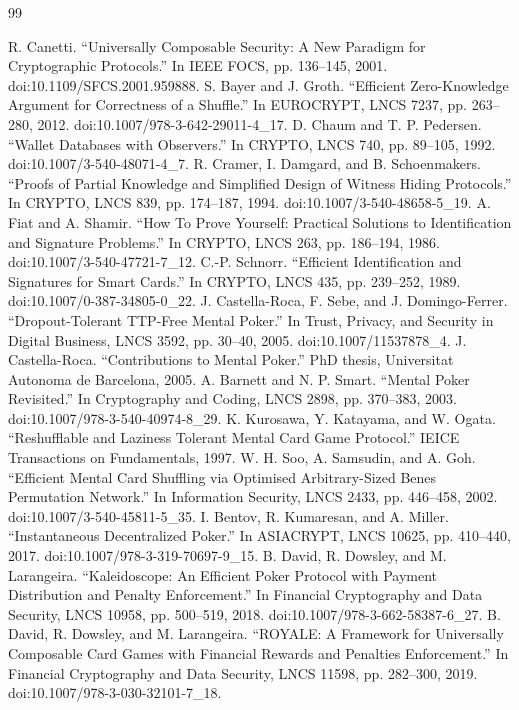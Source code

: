 \documentclass[11pt]{article}
\begin{document}
\begin{thebibliography}{99}

 R. Canetti. “Universally Composable Security: A New Paradigm for Cryptographic Protocols.” In IEEE FOCS, pp. 136–145, 2001. doi:10.1109/SFCS.2001.959888.
 S. Bayer and J. Groth. “Efficient Zero-Knowledge Argument for Correctness of a Shuffle.” In EUROCRYPT, LNCS 7237, pp. 263–280, 2012. doi:10.1007/978-3-642-29011-4\_17.
 D. Chaum and T. P. Pedersen. “Wallet Databases with Observers.” In CRYPTO, LNCS 740, pp. 89–105, 1992. doi:10.1007/3-540-48071-4\_7.
 R. Cramer, I. Damgard, and B. Schoenmakers. “Proofs of Partial Knowledge and Simplified Design of Witness Hiding Protocols.” In CRYPTO, LNCS 839, pp. 174–187, 1994. doi:10.1007/3-540-48658-5\_19.
 A. Fiat and A. Shamir. “How To Prove Yourself: Practical Solutions to Identification and Signature Problems.” In CRYPTO, LNCS 263, pp. 186–194, 1986. doi:10.1007/3-540-47721-7\_12.
 C.-P. Schnorr. “Efficient Identification and Signatures for Smart Cards.” In CRYPTO, LNCS 435, pp. 239–252, 1989. doi:10.1007/0-387-34805-0\_22.
 J. Castella-Roca, F. Sebe, and J. Domingo-Ferrer. “Dropout-Tolerant TTP-Free Mental Poker.” In Trust, Privacy, and Security in Digital Business, LNCS 3592, pp. 30–40, 2005. doi:10.1007/11537878\_4.
 J. Castella-Roca. “Contributions to Mental Poker.” PhD thesis, Universitat Autonoma de Barcelona, 2005.
 A. Barnett and N. P. Smart. “Mental Poker Revisited.” In Cryptography and Coding, LNCS 2898, pp. 370–383, 2003. doi:10.1007/978-3-540-40974-8\_29.
 K. Kurosawa, Y. Katayama, and W. Ogata. “Reshufflable and Laziness Tolerant Mental Card Game Protocol.” IEICE Transactions on Fundamentals, 1997.
 W. H. Soo, A. Samsudin, and A. Goh. “Efficient Mental Card Shuffling via Optimised Arbitrary-Sized Benes Permutation Network.” In Information Security, LNCS 2433, pp. 446–458, 2002. doi:10.1007/3-540-45811-5\_35.
 I. Bentov, R. Kumaresan, and A. Miller. “Instantaneous Decentralized Poker.” In ASIACRYPT, LNCS 10625, pp. 410–440, 2017. doi:10.1007/978-3-319-70697-9\_15.
 B. David, R. Dowsley, and M. Larangeira. “Kaleidoscope: An Efficient Poker Protocol with Payment Distribution and Penalty Enforcement.” In Financial Cryptography and Data Security, LNCS 10958, pp. 500–519, 2018. doi:10.1007/978-3-662-58387-6\_27.
 B. David, R. Dowsley, and M. Larangeira. “ROYALE: A Framework for Universally Composable Card Games with Financial Rewards and Penalties Enforcement.” In Financial Cryptography and Data Security, LNCS 11598, pp. 282–300, 2019. doi:10.1007/978-3-030-32101-7\_18.

\end{thebibliography}
\end{document}
